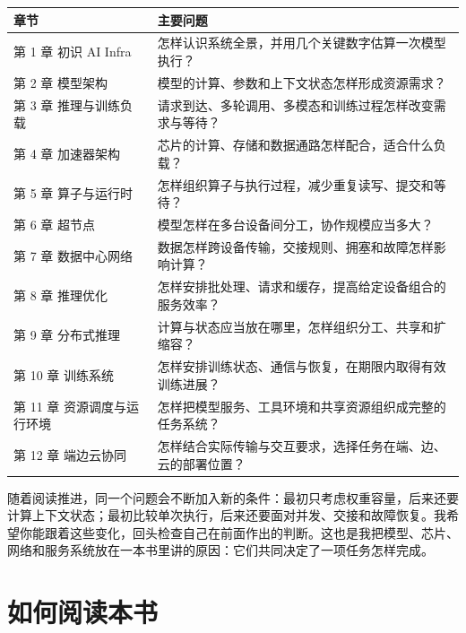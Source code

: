 \begin{longtable}[]{@{}
  >{\raggedright\arraybackslash}p{}
  >{\raggedright\arraybackslash}p{}@{}}
\toprule\noalign{}
\begin{minipage}[b]{\linewidth}\raggedright
章节
\end{minipage} & \begin{minipage}[b]{\linewidth}\raggedright
主要问题
\end{minipage} \\
\midrule\noalign{}
\endhead
\bottomrule\noalign{}
\endlastfoot
第 1 章 初识 AI Infra &
怎样认识系统全景，并用几个关键数字估算一次模型执行？ \\
第 2 章 模型架构 & 模型的计算、参数和上下文状态怎样形成资源需求？ \\
第 3 章 推理与训练负载 &
请求到达、多轮调用、多模态和训练过程怎样改变需求与等待？ \\
第 4 章 加速器架构 &
芯片的计算、存储和数据通路怎样配合，适合什么负载？ \\
第 5 章 算子与运行时 &
怎样组织算子与执行过程，减少重复读写、提交和等待？ \\
第 6 章 超节点 & 模型怎样在多台设备间分工，协作规模应当多大？ \\
第 7 章 数据中心网络 &
数据怎样跨设备传输，交接规则、拥塞和故障怎样影响计算？ \\
第 8 章 推理优化 &
怎样安排批处理、请求和缓存，提高给定设备组合的服务效率？ \\
第 9 章 分布式推理 &
计算与状态应当放在哪里，怎样组织分工、共享和扩缩容？ \\
第 10 章 训练系统 &
怎样安排训练状态、通信与恢复，在期限内取得有效训练进展？ \\
第 11 章 资源调度与运行环境 &
怎样把模型服务、工具环境和共享资源组织成完整的任务系统？ \\
第 12 章 端边云协同 &
怎样结合实际传输与交互要求，选择任务在端、边、云的部署位置？ \\
\end{longtable}

随着阅读推进，同一个问题会不断加入新的条件：最初只考虑权重容量，后来还要计算上下文状态；最初比较单次执行，后来还要面对并发、交接和故障恢复。我希望你能跟着这些变化，回头检查自己在前面作出的判断。这也是我把模型、芯片、网络和服务系统放在一本书里讲的原因：它们共同决定了一项任务怎样完成。

\section*{如何阅读本书}\label{ux5982ux4f55ux9605ux8bfbux672cux4e66}

